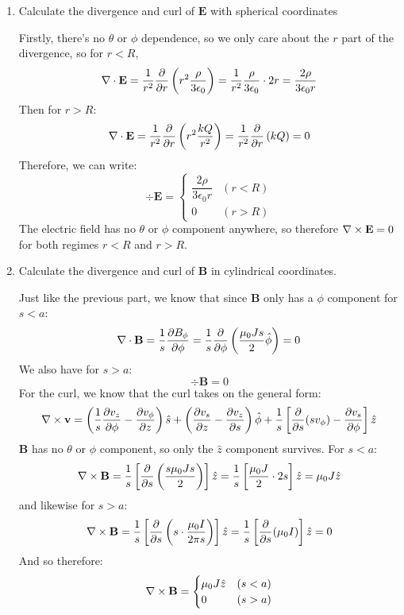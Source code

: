 \documentclass[10pt]{article}
\begin{document}
    \begin{enumerate}[label=(\alph*), start]
        \item Calculate the divergence and curl of $\mathbf E$ with spherical coordinates

        \begin{solution}
            Firstly, there's no $\theta$ or $\phi$ dependence, so we only care about the $r$ part of the divergence, so for $r < R$,
            \[ \nabla \cdot \mathbf E = \frac{1}{r^2}\pdv{r}\left(r^2 \frac{\rho}{3\epsilon_0}\right) = \frac{1}{r^2} \frac{\rho}{3\epsilon_0} \cdot 2r = \frac{2\rho}{3\epsilon_0r}\]
            Then for $r > R$: 
            \[ \nabla \cdot \mathbf E = \frac{1}{r^2} \pdv{r} \left( r^2 \frac{kQ}{r^2}\right) =  \frac{1}{r^2} \pdv{r}\left( kQ\right) = 0\]
            Therefore, we can write:
            \[ \div \mathbf E = \begin{cases}
                \dfrac{2\rho}{3\epsilon_0 r} & (r < R)\\
                0 & (r > R)
            \end{cases}\]
            The electric field has no $\theta$ or $\phi$ component anywhere, so therefore $\nabla \times \mathbf E = 0$ for both regimes $r < R$ and $r > R$. 
        \end{solution}
        \item Calculate the divergence and curl of $\mathbf B$ in cylindrical coordinates.
        
        \begin{solution}
            Just like the previous part, we know that since $\mathbf B$ only has a $\phi$ component for $s < a$: 
            \[ \nabla \cdot \mathbf B = \frac{1}{s} \pdv{B_{\phi}}{\phi} = \frac 1s \pdv{\phi}\left( \frac{\mu_0 Js}{2}\hat \phi \right) = 0\] 
            We also have for $s > a$: 
            \[ \div \mathbf B = 0\]
            For the curl, we know that the curl takes on the general form: 
            \[ \nabla \times \mathbf v = \left( \frac 1s \pdv{v_z}{\phi} - \pdv{v_\phi}{z}\right) \hat s + \left( \pdv{v_s}{z} - \pdv{v_z}{s}\right) \hat \phi + \frac 1s\left[\pdv{s}(s v_\phi) - \pdv{v_s}{\phi}\right]\hat z\]
            $\mathbf B$ has no $\theta$ or $\phi$ component, so only the $\hat z$ component survives. For $s < a$: 
            \[ \nabla \times \mathbf B = \frac 1s \left[ \pdv{s}\left( \frac{s \mu_0 J s}{2}\right) \right] \hat z = \frac 1s \left[ \frac{\mu_0 J}{2} \cdot 2s\right] \hat z = \mu_0 J \hat z\]
            and likewise for $s > a$: 
            \[ \nabla \times \mathbf B = \frac 1s\left[ \pdv{s}\left( s \cdot \frac{\mu_0 I}{2\pi s}\right) \right] \hat z = \frac 1s \left[\pdv{s}(\mu_0 I)\right]\hat z = 0\] 
            And so therefore:
            \[ \nabla \times \mathbf B = \begin{cases}
                \mu_0 J \hat z & (s < a)\\
                0 & (s > a)
            \end{cases}\]
        \end{solution}
    \end{enumerate}
\end{document}
